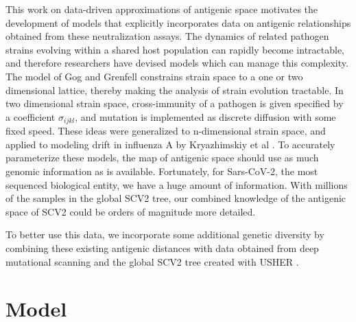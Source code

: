 \documentclass{article}
\begin{document}
This work on data-driven approximations of antigenic space motivates the development of models that explicitly incorporates data on antigenic relationships obtained from these neutralization assays.
The dynamics of related pathogen strains evolving within a shared host population can rapidly become intractable, and therefore researchers have devised models which can manage this complexity.
The model of Gog and Grenfell \cite{gogDynamicsSelectionManystrain2002} constrains strain space to a one or two dimensional lattice, thereby making the analysis of strain evolution tractable. 
In two dimensional strain space, cross-immunity of a pathogen is given specified by a coefficient $\sigma_{ijkl}$, and mutation is implemented as discrete diffusion with some fixed speed. 
These ideas were generalized to n-dimensional strain space, and applied to modeling drift in influenza A by Kryazhimskiy et al \cite{kryazhimskiyStateSpaceReductionMultiStrain2007}. 
To accurately parameterize these models, the map of antigenic space should use as much genomic information as is available.
Fortunately, for Sars-CoV-2, the most sequenced biological entity, we have a huge amount of information. 
With millions of the samples in the global SCV2 tree, our combined knowledge of the antigenic space of SCV2 could be orders of magnitude more detailed.

To better use this data, we incorporate some additional genetic diversity by combining these existing antigenic distances with data obtained from deep mutational scanning \cite{starr2020deep} and the global SCV2 tree created with USHER \cite{turakhia2021ultrafast}.






\section{Model}
\end{document}
